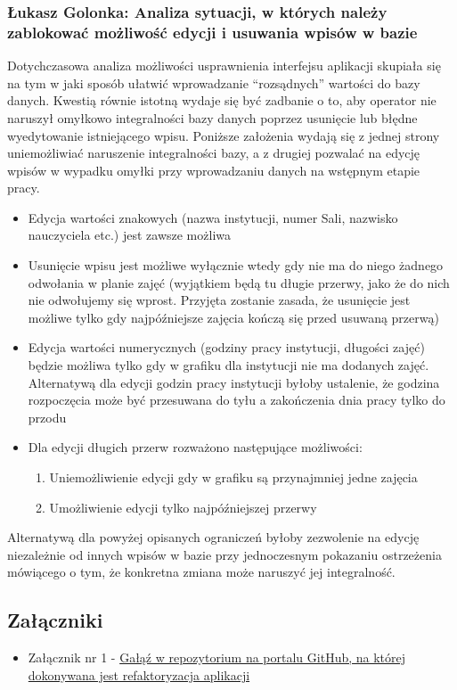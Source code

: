 \documentclass[12pt,a4paper,oneside]{article}
\theoremstyle{definition}
\numberwithin{equation}{section}
\begin{document}
\subsubsection{Łukasz Golonka: Analiza sytuacji, w których należy zablokować możliwość edycji i usuwania wpisów w bazie} \label{restrictions}
Dotychczasowa analiza  możliwości usprawnienia interfejsu aplikacji skupiała się na tym w jaki sposób ułatwić wprowadzanie ``rozsądnych'' wartości do bazy danych.
Kwestią równie istotną wydaje się być zadbanie o to, aby operator nie naruszył omyłkowo integralności bazy danych poprzez usunięcie lub błędne wyedytowanie istniejącego wpisu.
Poniższe założenia wydają się z jednej strony uniemożliwiać naruszenie integralności bazy, a z drugiej pozwalać na edycję wpisów w wypadku omyłki przy wprowadzaniu danych na wstępnym etapie pracy.
\begin{itemize}
	\item Edycja wartości znakowych (nazwa instytucji, numer Sali, nazwisko nauczyciela etc.) jest zawsze możliwa
	\item Usunięcie wpisu jest możliwe wyłącznie wtedy gdy nie ma do niego żadnego odwołania w planie zajęć (wyjątkiem będą tu długie przerwy, jako że do nich nie odwołujemy się wprost. Przyjęta zostanie zasada, że usunięcie jest możliwe tylko gdy najpóźniejsze zajęcia kończą się przed usuwaną przerwą)
	\item Edycja wartości numerycznych (godziny pracy instytucji, długości zajęć) będzie możliwa tylko gdy w grafiku dla instytucji nie ma dodanych zajęć. Alternatywą dla edycji godzin pracy instytucji byłoby ustalenie, że godzina rozpoczęcia może być przesuwana do tyłu a zakończenia dnia pracy tylko do przodu
	\item Dla edycji długich przerw rozważono następujące możliwości:
	\begin{enumerate}
		\item Uniemożliwienie edycji gdy w grafiku są przynajmniej jedne zajęcia
		\item Umożliwienie edycji tylko najpóźniejszej przerwy
	\end{enumerate}
\end{itemize}
Alternatywą dla powyżej opisanych ograniczeń byłoby zezwolenie na edycję niezależnie od innych wpisów w bazie przy jednoczesnym pokazaniu ostrzeżenia mówiącego o tym, że konkretna zmiana może naruszyć jej integralność.

\subsection{Załączniki}
\begin{itemize}
	\item Załącznik nr 1 - \href{https://github.com/lukaszgo1/engineering_project_2022/tree/mvp}{Gałąź w repozytorium na portalu GitHub, na której dokonywana jest refaktoryzacja aplikacji}
\end{itemize}
\end{document}
